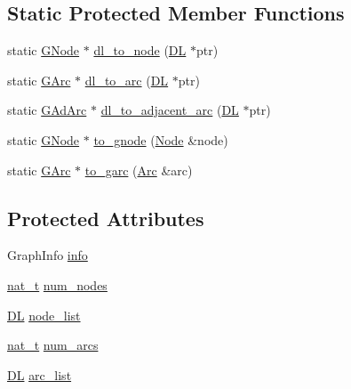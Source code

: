 \subsection*{Static Protected Member Functions}
\begin{DoxyCompactItemize}
\item 
static \hyperlink{class_designar_1_1_graph_a7e61951db0bb9bfa8a2e317440d4e17f}{G\+Node} $\ast$ \hyperlink{class_designar_1_1_graph_ab6f1de18d2ec0c537fc1daa5b4a42e01}{dl\+\_\+to\+\_\+node} (\hyperlink{class_designar_1_1_d_l}{DL} $\ast$ptr)
\item 
static \hyperlink{class_designar_1_1_graph_a5ad9e18b71899c2d4979426e367e5573}{G\+Arc} $\ast$ \hyperlink{class_designar_1_1_graph_a543b3279c059a0ee596a56a704ab7825}{dl\+\_\+to\+\_\+arc} (\hyperlink{class_designar_1_1_d_l}{DL} $\ast$ptr)
\item 
static \hyperlink{class_designar_1_1_graph_a7d00558995946c5653522148b54971bc}{G\+Ad\+Arc} $\ast$ \hyperlink{class_designar_1_1_graph_afb508b7f8616948cc46c33deddcfaa4c}{dl\+\_\+to\+\_\+adjacent\+\_\+arc} (\hyperlink{class_designar_1_1_d_l}{DL} $\ast$ptr)
\item 
static \hyperlink{class_designar_1_1_graph_a7e61951db0bb9bfa8a2e317440d4e17f}{G\+Node} $\ast$ \hyperlink{class_designar_1_1_graph_a23038b7502c6fdb53b23453b19579c0e}{to\+\_\+gnode} (\hyperlink{class_designar_1_1_graph_a5dfc7dba9d092ac489c72e40390c37d0}{Node} \&node)
\item 
static \hyperlink{class_designar_1_1_graph_a5ad9e18b71899c2d4979426e367e5573}{G\+Arc} $\ast$ \hyperlink{class_designar_1_1_graph_ab79eb63dd332e483db77da69c1b04522}{to\+\_\+garc} (\hyperlink{class_designar_1_1_graph_a74c730ef4ce2d20f998d72bd25c2b5bf}{Arc} \&arc)
\end{DoxyCompactItemize}
\subsection*{Protected Attributes}
\begin{DoxyCompactItemize}
\item 
Graph\+Info \hyperlink{class_designar_1_1_graph_a2a8b41ce641ad2fb1b84a4d6b024bb1a}{info}
\item 
\hyperlink{namespace_designar_aa72662848b9f4815e7bf31a7cf3e33d1}{nat\+\_\+t} \hyperlink{class_designar_1_1_graph_a1ff2ba87ab27911b1f6d47e622e67542}{num\+\_\+nodes}
\item 
\hyperlink{class_designar_1_1_d_l}{DL} \hyperlink{class_designar_1_1_graph_a31b0117b6d87816f703a4a5baa1fa6ce}{node\+\_\+list}
\item 
\hyperlink{namespace_designar_aa72662848b9f4815e7bf31a7cf3e33d1}{nat\+\_\+t} \hyperlink{class_designar_1_1_graph_a035a0debf7a7545d0033f37cf941020f}{num\+\_\+arcs}
\item 
\hyperlink{class_designar_1_1_d_l}{DL} \hyperlink{class_designar_1_1_graph_a8c809db7848c78f6718aad466ee959b2}{arc\+\_\+list}
\end{DoxyCompactItemize}
